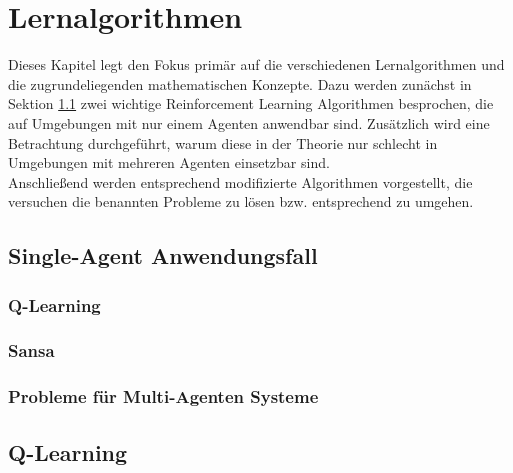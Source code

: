 \chapter{Lernalgorithmen}
\label{chap:learning}

Dieses Kapitel legt den Fokus primär auf die verschiedenen Lernalgorithmen und die zugrundeliegenden mathematischen Konzepte. Dazu werden zunächst in  Sektion \ref{chap:learning:single-agent} zwei wichtige Reinforcement Learning Algorithmen besprochen, die auf Umgebungen mit nur einem Agenten anwendbar sind. Zusätzlich wird eine Betrachtung durchgeführt, warum diese in der Theorie nur schlecht in Umgebungen mit mehreren Agenten einsetzbar sind. \\
Anschließend werden entsprechend modifizierte Algorithmen vorgestellt, die versuchen die benannten Probleme zu lösen bzw. entsprechend zu umgehen. 

\section{Single-Agent Anwendungsfall}
\label{chap:learning:single-agent}

\subsection{Q-Learning}

\subsection{Sansa}

\subsection{Probleme für Multi-Agenten Systeme}

\section{Q-Learning}